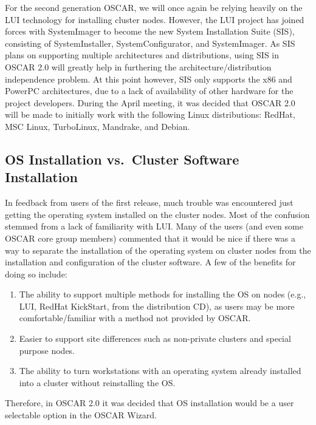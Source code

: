 For the second generation OSCAR, we will once again be relying heavily
on the LUI technology for installing cluster nodes.  However, the LUI
project has joined forces with SystemImager to become the new System
Installation Suite (SIS), consisting of SystemInstaller,
SystemConfigurator, and SystemImager. As SIS plans on supporting
multiple architectures and distributions, using SIS in OSCAR 2.0 will
greatly help in furthering the architecture/distribution independence
problem. At this point however, SIS only supports the x86 and PowerPC
architectures, due to a lack of availability of other hardware for the
project developers. During the April meeting, it was decided that
OSCAR 2.0 will be made to initially work with the following Linux
distributions: RedHat, MSC Linux, TurboLinux, Mandrake, and Debian.

\subsection{OS Installation vs.\ Cluster Software Installation}

In  feedback  from  users  of  the first  release,  much  trouble  was
encountered just getting the operating system installed on the cluster
nodes. Most of  the confusion stemmed from a  lack of familiarity with
LUI.  Many of  the  users (and  even  some OSCAR  core group  members)
commented that  it would be  nice if there  was a way to  separate the
installation  of  the  operating  system  on cluster  nodes  from  the
installation and configuration  of the cluster software. A  few of the
benefits for doing so include:

\begin{enumerate}
\item The ability to support multiple methods for installing the OS on
  nodes (e.g., LUI, RedHat KickStart, from the distribution CD), as
  users may be more comfortable/familiar with a method not provided by
  OSCAR.
  
\item Easier to support site differences such as non-private clusters
  and special purpose nodes.
  
\item The ability to turn workstations with an operating system
  already installed into a cluster without reinstalling the OS.
\end{enumerate}

Therefore, in OSCAR 2.0 it was decided that OS installation would be a
user selectable option in the OSCAR Wizard.

